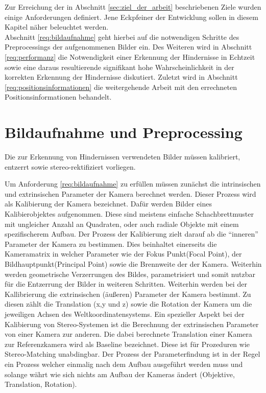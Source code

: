 Zur Erreichung der in Abschnitt \ref{sec:ziel_der_arbeit} beschriebenen Ziele wurden einige Anforderungen definiert. Jene Eckpfeiner der Entwicklung sollen in diesem Kapitel näher beleuchtet werden.\\

\noindent
Abschnitt \ref{req:bildaufnahme} geht hierbei auf die notwendigen Schritte des Preprocessings der aufgenommenen Bilder ein. Des Weiteren wird in Abschnitt \ref{req:performanz} die Notwendigkeit einer Erkennung der Hindernisse in Echtzeit sowie eine daraus resultierende signifikant hohe Wahrscheinlichkeit in der korrekten Erkennung der Hindernisse diskutiert. Zuletzt wird in Abschnitt \ref{req:positionsinformationen} die weitergehende Arbeit mit den errechneten Positionsinformationen behandelt.

\section{Bildaufnahme und Preprocessing}
\label{sec:bildaufnahme_preprocessing}

	\begin{anforderung}
	\label{req:bildaufnahme}
		Die zur Erkennung von Hindernissen verwendeten Bilder müssen kalibriert, entzerrt sowie stereo-rektifiziert vorliegen.
	\end{anforderung}

\noindent
Um Anforderung \ref{req:bildaufnahme} zu erfüllen müssen zunächst die intrinsischen und extrinsischen Parameter der Kamera berechnet werden. Dieser Prozess wird als Kalibierung der Kamera bezeichnet. Dafür werden Bilder eines Kalibierobjektes aufgenommen. Diese sind meistens einfache Schachbrettmuster mit ungleicher Anzahl an Quadraten, oder auch radiale Objekte mit einem spezifischerem Aufbau. Der Prozess der Kalibierung zielt darauf ab die \enquote{inneren} Parameter der Kamera zu bestimmen. Dies beinhaltet einerseits die Kameramatrix in welcher Parameter wie der Fokus Punkt(Focal Point), der Bildhauptpunkt(Principal Point) sowie die Brennweite der der Kamera. Weiterhin werden geometrische Verzerrungen des Bildes,  parametrisiert und somit nutzbar für die Entzerrung der Bilder in weiteren Schritten. Weiterhin werden bei der Kallibrierung die extrinsischen (äußeren) Parameter der Kamera bestimmt. Zu diesen zählt die Translation (x,y und z) sowie die Rotation der Kamera um die jeweiligen Achsen des Weltkoordinatensystems. Ein spezieller Aspekt bei der Kalibierung von Stereo-Systemen ist die Berechnung der extrinsischen Parameter von einer Kamera zur anderen. Die dabei berechnete Translation einer Kamera zur Referenzkamera wird als Baseline bezeichnet. Diese ist für Prozeduren wie Stereo-Matching unabdingbar. Der Prozess der Parameterfindung ist in der Regel ein Prozess welcher einmalig nach dem Aufbau ausgeführt werden muss und solange währt wie sich nichts am Aufbau der Kameras ändert (Objektive, Translation, Rotation).\\

